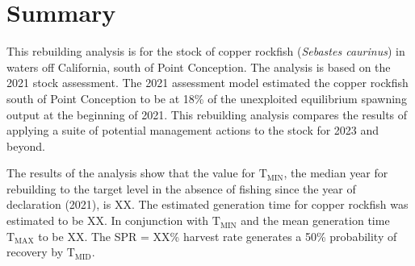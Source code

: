 \documentclass[11pt,
  english,
  a4paper,
]{article}
\begin{document}
\newcommand{\lt}{\ensuremath <}
\newcommand{\gt}{\ensuremath >}

\pagebreak
{}
\setcounter{page}{1}

\renewcommand{\thetable}{\roman{table}}
\renewcommand{\thefigure}{\roman{figure}}

\setlength\parskip{0.5em plus 0.1em minus 0.2em}


\hypertarget{summary}{%
\section*{Summary}\label{summary}}

\leavevmode\tagmcend\tagstructend


This rebuilding analysis is for the stock of copper rockfish (\emph{Sebastes caurinus}) in waters off California, south of Point Conception. The analysis is based on the 2021 stock assessment. The 2021 assessment model estimated the copper rockfish south of Point Conception to be at 18\% of the unexploited equilibrium spawning output at the beginning of 2021. This rebuilding analysis compares the results of applying a suite of potential management actions to the stock for 2023 and beyond.

\leavevmode\tagmcend\tagstructend\par


The results of the analysis show that the value for {\(\text{T}_\text{MIN}\)\leavevmode\tagmcend\tagstructend}, the median year for rebuilding to the target level in the absence of fishing since the year of declaration (2021), is XX. The estimated generation time for copper rockfish was estimated to be XX. In conjunction with {\(\text{T}_\text{MIN}\)\leavevmode\tagmcend\tagstructend} and the mean generation time {\(\text{T}_\text{MAX}\)\leavevmode\tagmcend\tagstructend} to be XX. The SPR = XX\% harvest rate generates a 50\% probability of recovery by {\(\text{T}_\text{MID}\)\leavevmode\tagmcend\tagstructend}.

\leavevmode\tagmcend\tagstructend\par
\end{document}
